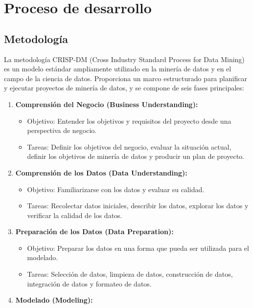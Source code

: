 \documentclass{article}
\begin{document}
\section{Proceso de desarrollo}

\subsection{Metodología}
La metodología CRISP-DM (Cross Industry Standard Process for Data Mining) es un modelo estándar ampliamente utilizado en la minería de datos y en el campo de la ciencia de datos. Proporciona un marco estructurado para planificar y ejecutar proyectos de minería de datos, y se compone de seis fases principales:

\begin{enumerate}
\item \textbf{Comprensión del Negocio (Business Understanding):}

\begin{itemize}
\item Objetivo: Entender los objetivos y requisitos del proyecto desde una perspectiva de negocio.
\item Tareas: Definir los objetivos del negocio, evaluar la situación actual, definir los objetivos de minería de datos y producir un plan de proyecto.
\end{itemize}

\item \textbf{Comprensión de los Datos (Data Understanding):}

\begin{itemize}
\item Objetivo: Familiarizarse con los datos y evaluar su calidad.
\item Tareas: Recolectar datos iniciales, describir los datos, explorar los datos y verificar la calidad de los datos.
\end{itemize}

\item \textbf{Preparación de los Datos (Data Preparation):}

\begin{itemize}
\item Objetivo: Preparar los datos en una forma que pueda ser utilizada para el modelado.
\item Tareas: Selección de datos, limpieza de datos, construcción de datos, integración de datos y formateo de datos.
\end{itemize}

\item \textbf{Modelado (Modeling):}


\end{enumerate}
\end{document}
